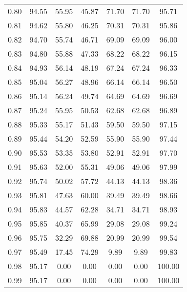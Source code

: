 \begin{tabular}{|c|c|c|c|c|c|c|}
      0.80 &     94.55 &     55.95 &      45.87 &   71.70 &      71.70 &         95.71 \\
      0.81 &     94.62 &     55.80 &      46.25 &   70.31 &      70.31 &         95.86 \\
      0.82 &     94.70 &     55.74 &      46.71 &   69.09 &      69.09 &         96.00 \\
      0.83 &     94.80 &     55.88 &      47.33 &   68.22 &      68.22 &         96.15 \\
      0.84 &     94.93 &     56.14 &      48.19 &   67.24 &      67.24 &         96.33 \\
      0.85 &     95.04 &     56.27 &      48.96 &   66.14 &      66.14 &         96.50 \\
      0.86 &     95.14 &     56.24 &      49.74 &   64.69 &      64.69 &         96.69 \\
      0.87 &     95.24 &     55.95 &      50.53 &   62.68 &      62.68 &         96.89 \\
      0.88 &     95.33 &     55.17 &      51.43 &   59.50 &      59.50 &         97.15 \\
      0.89 &     95.44 &     54.20 &      52.59 &   55.90 &      55.90 &         97.44 \\
      0.90 &     95.53 &     53.35 &      53.80 &   52.91 &      52.91 &         97.70 \\
      0.91 &     95.63 &     52.00 &      55.31 &   49.06 &      49.06 &         97.99 \\
      0.92 &     95.74 &     50.02 &      57.72 &   44.13 &      44.13 &         98.36 \\
      0.93 &     95.81 &     47.63 &      60.00 &   39.49 &      39.49 &         98.66 \\
      0.94 &     95.83 &     44.57 &      62.28 &   34.71 &      34.71 &         98.93 \\
      0.95 &     95.85 &     40.37 &      65.99 &   29.08 &      29.08 &         99.24 \\
      0.96 &     95.75 &     32.29 &      69.88 &   20.99 &      20.99 &         99.54 \\
      0.97 &     95.49 &     17.45 &      74.29 &    9.89 &       9.89 &         99.83 \\
      0.98 &     95.17 &      0.00 &       0.00 &    0.00 &       0.00 &        100.00 \\
      0.99 &     95.17 &      0.00 &       0.00 &    0.00 &       0.00 &        100.00 \\
\bottomrule
\end{tabular}
